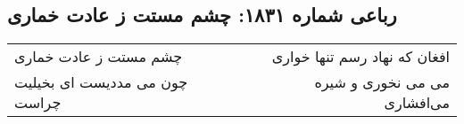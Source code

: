 \begin{center}
\section*{رباعی شماره ۱۸۳۱: چشم مستت ز عادت خماری}
\label{sec:1831}
\begin{longtable}{l p{0.5cm} r}
چشم مستت ز عادت خماری
&&
افغان که نهاد رسم تنها خواری
\\
چون می مددیست ای بخیلیت چراست
&&
می می نخوری و شیره می‌افشاری
\\
\end{longtable}
\end{center}
